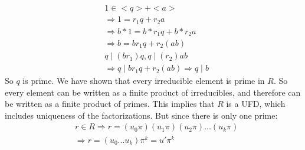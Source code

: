 \documentclass[11pt]{article}
\begin{document}
{\begin{align*}
     & 1 \in <q> + <a>                                                                      \\
     & \Rightarrow 1 = r_1q + r_2a                                                          \\
     & \Rightarrow b*1 = b*r_1q + b*r_2a                                                    \\
     & \Rightarrow b = br_1q + r_2(ab)                                                      \\
     & q \mid (br_1)q, q \mid (r_2)ab                                                       \\
     & \Rightarrow q \mid br_1q + r_2(ab) \Rightarrow q \mid b
  \end{align*}
  So $q$ is prime. We have shown that every irreducible element is prime in $R$. So every element can be written as a finite product of irreducibles, and therefore can be written as a finite product of primes. This implies that $R$ is a UFD, which includes uniqueness of the factorizations. But since there is only one prime:
  \begin{align*}
     & r \in R \Rightarrow r = (u_0\pi)(u_1\pi)(u_2\pi)...(u_k\pi) \\
     & \Rightarrow r = (u_0...u_k)\pi^k = u'\pi^k                  \\
  \end{align*}

}
\end{document}
